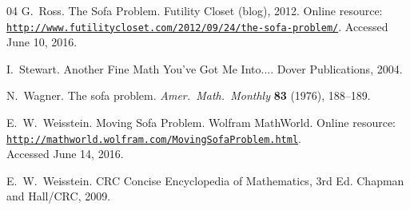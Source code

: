 \documentclass[11pt]{article}
\begin{document}
\begin{thebibliography}{04}
 G.~Ross. The Sofa Problem. Futility Closet (blog), 2012. Online resource: \\ \href{http://www.futilitycloset.com/2012/09/24/the-sofa-problem/}{\texttt{http://www.futilitycloset.com/2012/09/24/the-sofa-problem/}}. Accessed June 10, 2016.

 I.~Stewart. Another Fine Math You've Got Me Into.... Dover Publications, 2004.

 N.~Wagner. The sofa problem. \textit{Amer.~Math.~Monthly} \textbf{83} (1976), 188--189.

 E.~W.~Weisstein. Moving Sofa Problem. Wolfram MathWorld. Online resource: 
\\\href{http://mathworld.wolfram.com/MovingSofaProblem.html}{\texttt{http://mathworld.wolfram.com/MovingSofaProblem.html}}. \\Accessed June 14, 2016.

 E.~W.~Weisstein. CRC Concise Encyclopedia of Mathematics, 3rd Ed. Chapman and Hall/CRC, 2009. 

\end{thebibliography}
\end{document}
